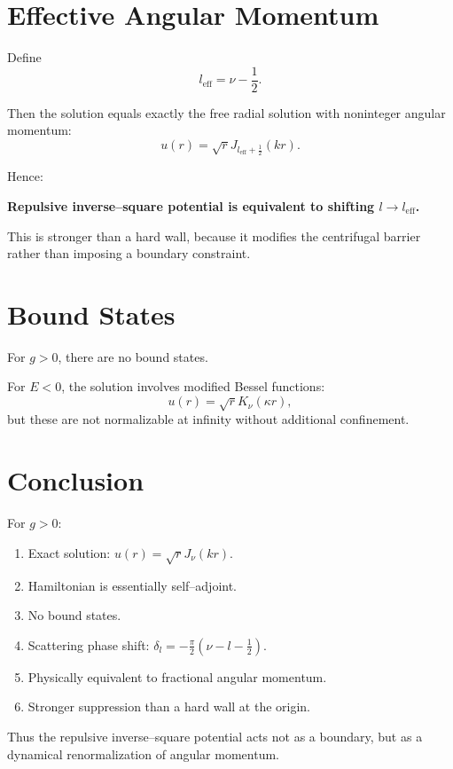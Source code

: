 \documentclass[11pt,a4paper]{article}
\begin{document}
\section{Effective Angular Momentum}

Define
\begin{equation}
l_{\text{eff}}
=
\nu-\frac{1}{2}.
\end{equation}

Then the solution equals exactly the free radial solution
with noninteger angular momentum:
\begin{equation}
u(r)
=
\sqrt{r}J_{l_{\text{eff}}+\frac{1}{2}}(kr).
\end{equation}

Hence:

\begin{center}
\textbf{Repulsive inverse--square potential
is equivalent to shifting $l\to l_{\text{eff}}$.}
\end{center}

This is stronger than a hard wall,
because it modifies the centrifugal barrier rather than imposing
a boundary constraint.

\section{Bound States}

For $g>0$, there are no bound states.

For $E<0$, the solution involves modified Bessel functions:
\begin{equation}
u(r)=\sqrt{r}K_\nu(\kappa r),
\end{equation}
but these are not normalizable at infinity without additional
confinement.

\section{Conclusion}

For $g>0$:

\begin{enumerate}
\item Exact solution: $u(r)=\sqrt{r}J_\nu(kr)$.
\item Hamiltonian is essentially self–adjoint.
\item No bound states.
\item Scattering phase shift:
\(
\delta_l=-\frac{\pi}{2}(\nu-l-\tfrac{1}{2}).
\)
\item Physically equivalent to fractional angular momentum.
\item Stronger suppression than a hard wall at the origin.
\end{enumerate}

Thus the repulsive inverse–square potential
acts not as a boundary,
but as a dynamical renormalization of angular momentum.
\end{document}
